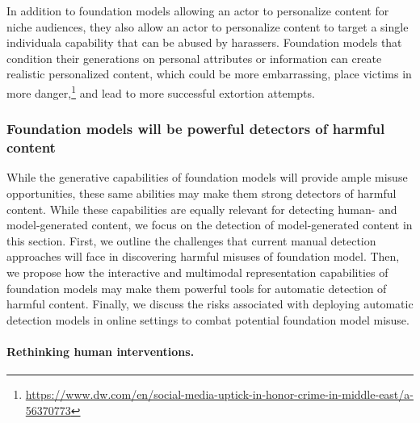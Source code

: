 In addition to foundation models allowing an actor to personalize content for niche audiences, they also allow an actor to personalize content to target a single individual\dash{}a capability that can be abused by harassers. 
Foundation models that condition their generations on personal attributes or information can create realistic personalized content, which could be more embarrassing, place victims in more danger,\footnote{\url{https://www.dw.com/en/social-media-uptick-in-honor-crime-in-middle-east/a-56370773}} and lead to more successful extortion attempts. 

\subsubsection{Foundation models will be powerful detectors of harmful content}

While the generative capabilities of foundation models will provide ample misuse opportunities, these same abilities may make them strong detectors of harmful content. While these capabilities are equally relevant for detecting human- and model-generated content, we focus on the detection of model-generated content in this section. First, we outline the challenges that current manual detection approaches will face in discovering harmful misuses of foundation model. Then, we propose how the interactive and multimodal representation capabilities of foundation models may make them powerful tools for automatic detection of harmful content. Finally, we discuss the risks associated with deploying automatic detection models in online settings to combat potential foundation model misuse.

\paragraph{Rethinking human interventions.} 

